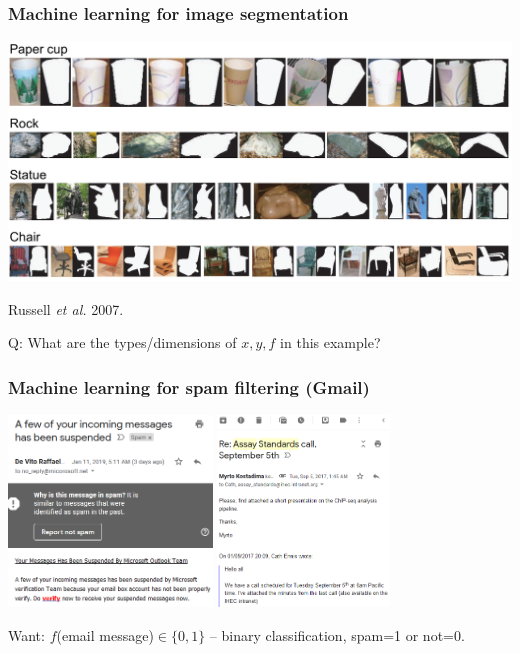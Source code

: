 \documentclass{beamer}
\begin{document}
\begin{frame}
  \frametitle{Machine learning for image segmentation}

  \includegraphics[width=\textwidth]{image-segmentation/labelme-examples}

  Russell {\it et al.} 2007.

  Q: What are the types/dimensions of $x,y,f$ in this example?

\end{frame}



\begin{frame}
  \frametitle{Machine learning for spam filtering (Gmail)}

  \includegraphics[height=2in]{spam-filtering/screenshot-gmail-spam}
  \includegraphics[height=2in]{spam-filtering/screenshot-inbox-message}

  Want: $f$(email message)$\in\{0,1\}$ -- binary classification, spam=1
  or not=0.

\end{frame}
\end{document}
